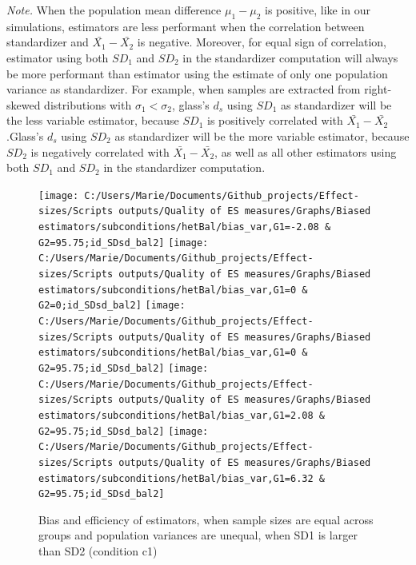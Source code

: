\documentclass[
  man,floatsintext]{apa6}
\begin{document}
\emph{Note.} When the population mean difference \(\mu_1-\mu_2\) is positive, like in our simulations, estimators are less performant when the correlation between standardizer and \(\bar{X_1}-\bar{X_2}\) is negative. Moreover, for equal sign of correlation, estimator using both \(SD_1\) and \(SD_2\) in the standardizer computation will always be more performant than estimator using the estimate of only one population variance as standardizer. For example, when samples are extracted from right-skewed distributions with \(\sigma_1 < \sigma_2\), glass's \(d_s\) using \(SD_1\) as standardizer will be the less variable estimator, because \(SD_1\) is positively correlated with \(\bar{X_1}-\bar{X_2}\).Glass's \(d_s\) using \(SD_2\) as standardizer will be the more variable estimator, because \(SD_2\) is negatively correlated with \(\bar{X_1}-\bar{X_2}\), as well as all other estimators using both \(SD_1\) and \(SD_2\) in the standardizer computation.

\begin{figure}

{\centering \texttt{[image: C:/Users/Marie/Documents/Github\_projects/Effect-sizes/Scripts outputs/Quality of ES measures/Graphs/Biased estimators/subconditions/hetBal/bias\_var,G1=-2.08 \& G2=95.75;id\_SDsd\_bal2]} \texttt{[image: C:/Users/Marie/Documents/Github\_projects/Effect-sizes/Scripts outputs/Quality of ES measures/Graphs/Biased estimators/subconditions/hetBal/bias\_var,G1=0 \& G2=0;id\_SDsd\_bal2]} \texttt{[image: C:/Users/Marie/Documents/Github\_projects/Effect-sizes/Scripts outputs/Quality of ES measures/Graphs/Biased estimators/subconditions/hetBal/bias\_var,G1=0 \& G2=95.75;id\_SDsd\_bal2]} \texttt{[image: C:/Users/Marie/Documents/Github\_projects/Effect-sizes/Scripts outputs/Quality of ES measures/Graphs/Biased estimators/subconditions/hetBal/bias\_var,G1=2.08 \& G2=95.75;id\_SDsd\_bal2]} \texttt{[image: C:/Users/Marie/Documents/Github\_projects/Effect-sizes/Scripts outputs/Quality of ES measures/Graphs/Biased estimators/subconditions/hetBal/bias\_var,G1=6.32 \& G2=95.75;id\_SDsd\_bal2]} 

}

\caption{Bias and efficiency of estimators, when sample sizes are equal across groups and population variances are unequal, when SD1 is larger than SD2 (condition c1)}\label{fig:idHetbal2}
\end{figure}
\end{document}
